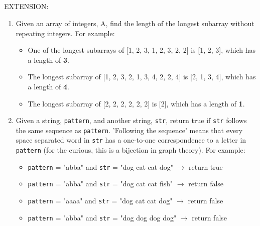 \documentclass{article}
\begin{document}
    \subsection*{}
    EXTENSION:
    \begin{enumerate}
        \item  Given an array of integers, A, find the length of the longest subarray without repeating integers.  For example:

        \begin{itemize}
            \item One of the longest subarrays of [1, 2, 3, 1, 2, 3, 2, 2] is [1, 2, 3], which has a length of \textbf{3}.
            \item The longest subarray of [1, 2, 3, 2, 1, 3, 4, 2, 2, 4] is [2, 1, 3, 4], which has a length of \textbf{4}.
            \item The longest subarray of [2, 2, 2, 2, 2, 2] is [2], which has a length of \textbf{1}.
        \end{itemize}
        \item Given a string, \texttt{pattern}, and another string, \texttt{str}, return true if \texttt{str} follows the same sequence as \texttt{pattern}.  'Following the sequence' means that every space separated word in \texttt{str} has a one-to-one correspondence to a letter in \texttt{pattern} (for the curious, this is a bijection in graph theory).  For example:

        \begin{itemize}
            \item \texttt{pattern} = "abba" and \texttt{str} = "dog cat cat dog" $\rightarrow$ return true
            \item \texttt{pattern} = "abba" and \texttt{str} = "dog cat cat fish" $\rightarrow$ return false
            \item \texttt{pattern} = "aaaa" and \texttt{str} = "dog cat cat dog" $\rightarrow$ return false
            \item \texttt{pattern} = "abba" and \texttt{str} = "dog dog dog dog" $\rightarrow$ return false
        \end{itemize}
    \end{enumerate}
\end{document}
